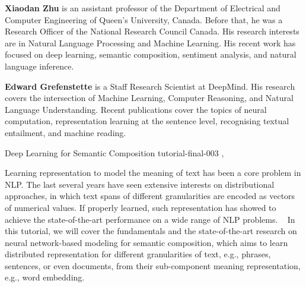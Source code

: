 \begin{bio}
  {\bfseries Xiaodan Zhu} is an assistant professor of the Department of Electrical and Computer Engineering of Queen’s University, Canada. Before that, he was a Research Officer of the National Research Council Canada. His research interests are in Natural Language Processing and Machine Learning. His recent work has focused on deep learning, semantic composition, sentiment analysis, and natural language inference.

  {\bfseries Edward Grefenstette} is a Staff Research Scientist at DeepMind. His research covers the intersection of Machine Learning, Computer Reasoning, and Natural Language Understanding. Recent publications cover the topics of neural computation, representation learning at the sentence level, recognising textual entailment, and machine reading. 
\end{bio}

\begin{tutorial}
  {Deep Learning for Semantic Composition}
  {tutorial-final-003}
  {\daydateyear, \tutorialmorningtime}
  {\TutLocC}

Learning representation to model the meaning of text has been a core problem in NLP. The last several years have seen extensive interests on distributional approaches, in which text spans of different granularities are encoded as vectors of numerical values. If properly learned, such representation has showed to achieve the state-of-the-art performance on a wide range of NLP problems.
 
In this tutorial, we will cover the fundamentals and the state-of-the-art research on neural network-based modeling for semantic composition, which aims to learn distributed representation for different granularities of text, e.g., phrases, sentences, or even documents, from their sub-component meaning representation, e.g., word embedding.
\end{tutorial}
